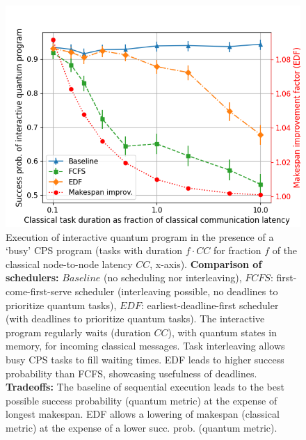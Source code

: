 \begin{figure}%
    \centering
    \includegraphics[width=1.0\columnwidth]{figures/qoala/tradeoffs_cq.png}
    \caption{Execution of interactive quantum program in the presence of a `busy' CPS program (tasks with duration $f \cdot CC$ for fraction $f$ of the classical node-to-node latency $CC$, x-axis).
    \textbf{Comparison of schedulers:}
    $Baseline$ (no scheduling nor interleaving),
    $FCFS$: first-come-first-serve scheduler (interleaving possible, no deadlines to prioritize quantum tasks),
    $EDF$: earliest-deadline-first scheduler (with deadlines to prioritize quantum tasks).
    The interactive program regularly waits (duration $CC$), with quantum states in memory, for incoming classical messages. %
    Task interleaving allows busy CPS tasks to fill waiting times.
    EDF leads to higher success probability than FCFS, showcasing usefulness of deadlines.
    \textbf{Tradeoffs:}
    The baseline of sequential execution leads to the best possible success probability (quantum metric) at the expense of longest makespan. EDF allows a lowering of makespan (classical metric) at the expense of a lower succ. prob. (quantum metric). 
    }
    \label{qoala:fig:eval_tradeoffs_cq}
\end{figure}

